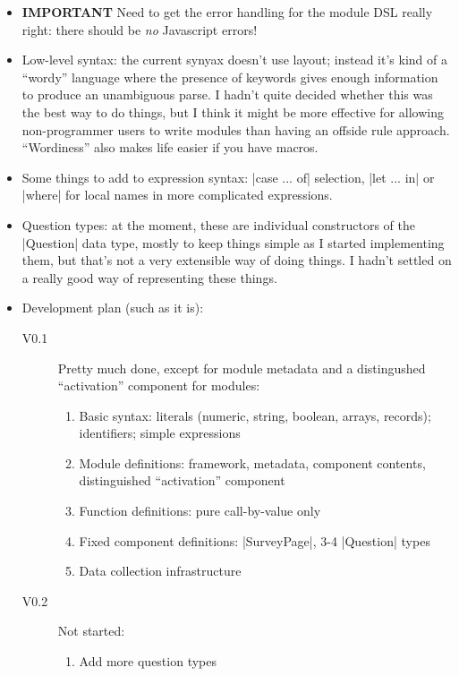 \documentclass[DIV=calc,paper=a4,fontsize=11pt]{scrartcl}
\begin{document}
\begin{itemize}
  \item{\textbf{IMPORTANT} Need to get the error handling for the
    module DSL really right: there should be \emph{no} Javascript
    errors!}
  \item{Low-level syntax: the current synyax doesn't use layout;
    instead it's kind of a ``wordy'' language where the presence of
    keywords gives enough information to produce an unambiguous parse.
    I hadn't quite decided whether this was the best way to do things,
    but I think it might be more effective for allowing non-programmer
    users to write modules than having an offside rule approach.
    ``Wordiness'' also makes life easier if you have macros.}
  \item{Some things to add to expression syntax: |case ... of|
    selection, |let ... in| or |where| for local names in more
    complicated expressions.}
  \item{Question types: at the moment, these are individual
    constructors of the |Question| data type, mostly to keep things
    simple as I started implementing them, but that's not a very
    extensible way of doing things.  I hadn't settled on a really good
    way of representing these things.}
  \item{Development plan (such as it is):
    \begin{description}
      \item[V0.1]{Pretty much done, except for module metadata and a
        distingushed ``activation'' component for modules:
        \begin{enumerate}
          \item{Basic syntax: literals (numeric, string, boolean,
            arrays, records); identifiers; simple expressions}
          \item{Module definitions: framework, metadata, component
            contents, distinguished ``activation'' component}
          \item{Function definitions: pure call-by-value only}
          \item{Fixed component definitions: |SurveyPage|, 3-4
            |Question| types}
          \item{Data collection infrastructure}
        \end{enumerate}}
      \item[V0.2]{Not started:
        \begin{enumerate}
          \item{Add more question types}

\end{enumerate}}
\end{description}}
\end{itemize}
\end{document}
